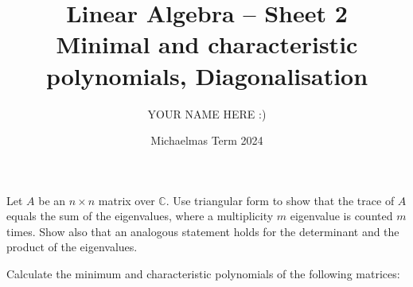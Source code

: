 \documentclass[answers]{exam}
\title{Linear Algebra -- Sheet 2\\Minimal and characteristic polynomials, Diagonalisation}
\author{YOUR NAME HERE :)}
\date{Michaelmas Term 2024}
\begin{document}
\maketitle

\begin{questions}

\question%
Let $A$ be an $n \times n$ matrix over $\mathbb{C}$. Use triangular form to show that the trace of $A$ equals the sum of the eigenvalues, where a multiplicity $m$ eigenvalue is counted $m$ times. Show also that an analogous statement holds for the determinant and the product of the eigenvalues.



\question%
Calculate the minimum and characteristic polynomials of the following matrices:



\question%
\end{questions}
\end{document}
